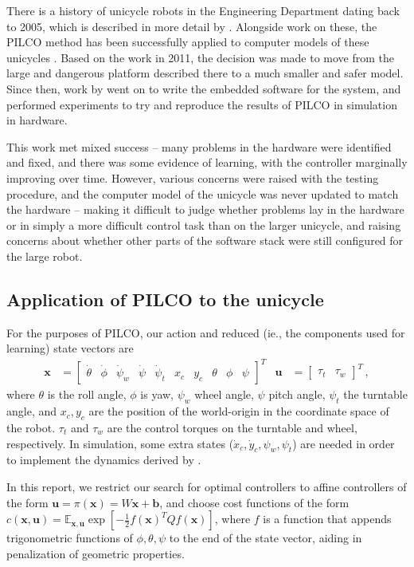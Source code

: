\documentclass[main.tex]{subfiles}
\begin{document}
	There is a history of unicycle robots in the Engineering Department dating back to 2005, which is described in more detail by \citeauthor{quiero} \cite{quiero}.
	Alongside work on these, the PILCO method has been successfully applied to computer models of these unicycles  \cite[section~3.3]{pilco}.
	Based on the work in 2011, the decision was made to move from the large and dangerous platform described there to a much smaller and safer model.
	Since then, work by \citeauthor{aleksi} \cite{aleksi} went on to write the embedded software for the system, and performed experiments to try and reproduce the results of PILCO in simulation in hardware.

	This work met mixed success -- many problems in the hardware were identified and fixed, and there was some evidence of learning, with the controller marginally improving over time.
	However, various concerns were raised with the testing procedure, and the computer model of the unicycle was never updated to match the hardware -- making it difficult to judge whether problems lay in the hardware or in simply a more difficult control task than on the larger unicycle, and raising concerns about whether other parts of the software stack were still configured for the large robot.

	\subsection{Application of PILCO to the unicycle}
		For the purposes of PILCO, our action and reduced (ie., the components used for learning)  state vectors are
		\begin{align}
			\bm{x} &= \begin{bmatrix}
				\dot\theta & \dot\phi &\dot\psi_w & \dot\psi & \dot\psi_t &
				x_c & y_c &
				\theta &
				\phi & \psi
			\end{bmatrix}^T &
			\bm{u} &= \begin{bmatrix}
				\tau_t & \tau_w
			\end{bmatrix}^T\,,
		\end{align}
		where $\theta$ is the roll angle, $\phi$ is yaw, $\psi_w$ wheel angle,
		$\psi$ pitch angle, $\psi_t$ the turntable angle, and $x_c, y_c$ are the position of the world-origin in the coordinate space of the robot.
		$\tau_t$ and $\tau_w$ are the control torques on the turntable and wheel, respectively.
		In simulation, some extra states ($\dot{x}_c, \dot{y}_c, \psi_w, \psi_t$) are needed in order to implement the dynamics derived by \citeauthor{forster} \cite{forster}.

		In this report, we restrict our search for optimal controllers to affine controllers of the form
		$\bm{u} = \pi(\bm{x}) = W\bm{x} + \bm{b}$, and choose cost functions of the form
		$c(\bm{x}, \bm{u}) = \mathbb{E}_{\bm{x}, \bm{u}} \exp\left[-\frac{1}{2} f(\bm{x})^T Q f(\bm{x})\right]$, where $f$ is a function that appends trigonometric functions of $\phi, \theta, \psi$ to the end of the state vector, aiding in penalization of geometric properties.

\bib
\end{document}
